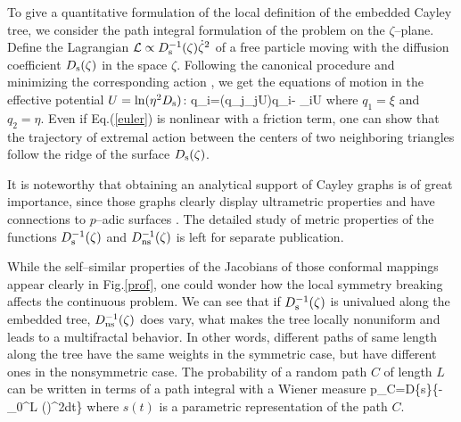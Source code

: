 To give a quantitative
formulation of the local definition of the embedded Cayley tree, we consider
the path  integral formulation of the problem on the $\zeta$--plane. Define
the  Lagrangian ${\cal L}\propto D^{-1}_{\rm s}(\zeta){\dot {\zeta}}^2$ of a free
particle  moving with the diffusion coefficient $D_{\rm s}(\zeta)$ in the  space
$\zeta$. Following  the canonical procedure and minimizing the corresponding
action  \cite{feynman}, we get the equations of motion in the effective
potential  $U=\ln(\eta^{2}D_{\rm s})$:
\be \label{euler}
\ddot q_{i}=({\dot q_j}\partial_{j}U){\dot q_i}-
\partial_{i}U 
\ee
where $q_1=\xi$ and $q_2=\eta$. Even if Eq.(\ref{euler}) is nonlinear with a 
friction term, one can show that the trajectory of extremal action  between the centers of two neighboring triangles follow the ridge of
the surface $D_{\rm s}(\zeta)$. 

It is noteworthy that obtaining an analytical support of Cayley graphs is 
of great importance, since those graphs clearly display ultrametric 
properties and have  connections to $p$--adic surfaces \cite{freund}. 
The detailed study of metric properties of the functions $D^{-1}_{\rm s}(\zeta)$ 
and $D^{-1}_{\rm ns}(\zeta)$ is left for separate publication.

While the self--similar properties of the Jacobians of those conformal mappings
appear clearly in Fig.\ref{prof}, one  could wonder how the local symmetry breaking
affects the continuous problem. We  can see that if $D^{-1}_{\rm s}(\zeta)$ is
univalued along the embedded tree,  $D^{-1}_{\rm ns}(\zeta)$ does vary, what
makes the tree  locally nonuniform and leads to a  multifractal behavior. In other
words, different paths of same length along  the tree have the same weights in
the symmetric case, but have different ones  in the nonsymmetric case.  The
probability of a random path $C$ of length $L$ can be written in terms of a
path integral with a Wiener measure
\be \label{weight}
p_C={\cal D}\{s\}\exp\left\{-\int_0^{L}
\left(\right)^{2}dt\right\}
\ee
where $s(t)$ is a parametric representation of the path $C$.

